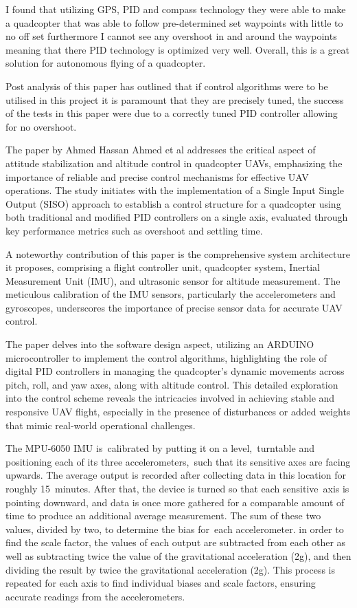 \documentclass{report}
\begin{document}
I found that utilizing GPS, PID and compass technology they were able to make a
quadcopter that was able to follow pre-determined set waypoints with little to
no off set furthermore I cannot see any overshoot in and around the waypoints
meaning that there PID technology is optimized very well. Overall, this is a
great solution for autonomous flying of a quadcopter.

Post analysis of this paper has outlined that if control algorithms were to be
utilised in this project it is paramount that they are precisely tuned, the
success of the tests in this paper were due to a correctly tuned PID controller
allowing for no overshoot. 

The paper by Ahmed Hassan Ahmed et al \cite{AhmedHassan2016} addresses the
critical aspect of attitude stabilization and altitude control in quadcopter
UAVs, emphasizing the importance of reliable and precise control mechanisms for
effective UAV operations. The study initiates with the implementation of a
Single Input Single Output (SISO) approach to establish a control structure for
a quadcopter using both traditional and modified PID controllers on a single
axis, evaluated through key performance metrics such as overshoot and settling
time.

A noteworthy contribution of this paper is the comprehensive system architecture
it proposes, comprising a flight controller unit, quadcopter system, Inertial
Measurement Unit (IMU), and ultrasonic sensor for altitude measurement. The
meticulous calibration of the IMU sensors, particularly the accelerometers and
gyroscopes, underscores the importance of precise sensor data for accurate UAV
control.

The paper delves into the software design aspect, utilizing an ARDUINO
microcontroller to implement the control algorithms, highlighting the role of
digital PID controllers in managing the quadcopter's dynamic movements across
pitch, roll, and yaw axes, along with altitude control. This detailed
exploration into the control scheme reveals the intricacies involved in
achieving stable and responsive UAV flight, especially in the presence of
disturbances or added weights that mimic real-world operational challenges.

The MPU-6050 IMU is calibrated by putting it on a level, turntable and
positioning each of its three accelerometers, such that its sensitive axes are
facing upwards. The average output is recorded after collecting data in this
location for roughly 15 minutes. After that, the device is turned so that each
sensitive axis is pointing downward, and data is once more gathered for a
comparable amount of time to produce an additional average measurement. The sum
of these two values, divided by two, to determine the bias for each
accelerometer. in order to find the scale factor, the values of each output are
subtracted from each other as well as subtracting twice the value of the
gravitational acceleration (2g), and then dividing the result by twice the
gravitational acceleration (2g). This process is repeated for each axis to find
individual biases and scale factors, ensuring accurate readings from the
accelerometers.
\end{document}

